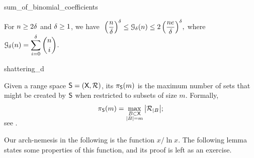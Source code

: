 
\providecommand{\LemmaGrowthImproved}{%
   For $n \geq 2\Dim$ and $\Dim \geq 1$, we have 
   \begin{math}
       \;\displaystyle%
       \pth{\frac{n }{\Dim}}^\Dim%
       \leq%
       \Growth{\Dim}{n}%
       \leq%
       2\, \pth{\frac{n e}{\Dim}}^\Dim,
   \end{math}
   where $\ds\Growth{\Dim}{n} = \sum_{i=0}^{\Dim} \binom{n}{i}$.}

\begin{fragment}{sum_of_binomial_coefficients}
    \providecommand{\LemmaGrowthImproved}{%
       For $n \geq 2\Dim$ and $\Dim \geq 1$, we have
       \begin{math}
           \;\displaystyle \pth{\frac{n }{\Dim}}^\Dim%
           \leq%
           \Growth{\Dim}{n}%
           \leq%
           2\; \pth{\frac{n e}{\Dim}}^\Dim,
       \end{math}
        where $\ds\Growth{\Dim}{n} =
       \sum_{i=0}^{\Dim} \binom{n}{i}$.}
    \begin{lemma}
        \LemmaGrowthImproved        
    \end{lemma}
\end{fragment}


\begin{fragment}{shattering_d}
    \begin{defn}
        Given a range space $\mathsf{S} = (\textsf{X}, {\mathcal{R}})$,
        its  $\pi_{\mathsf{S}}(m)$ is
        the maximum number of sets that might be created by
        $\mathsf{S}$ when restricted to subsets of size
        $m$. Formally,
        \begin{equation*}
            \ShatterFunc{\RangeSpace}(m)%
            =%
            \smash{\max_{\substack{B \subset \GroundSet\\
                     \cardin{B} = m}} \cardin{ \VCProj{\RangeSet}{B} }};
        \end{equation*}
        see .
    \end{defn}
\end{fragment}



Our arch-nemesis in the following is the function $x / \ln x$. The
following lemma states some properties of this function, and its proof
is left as an exercise.


